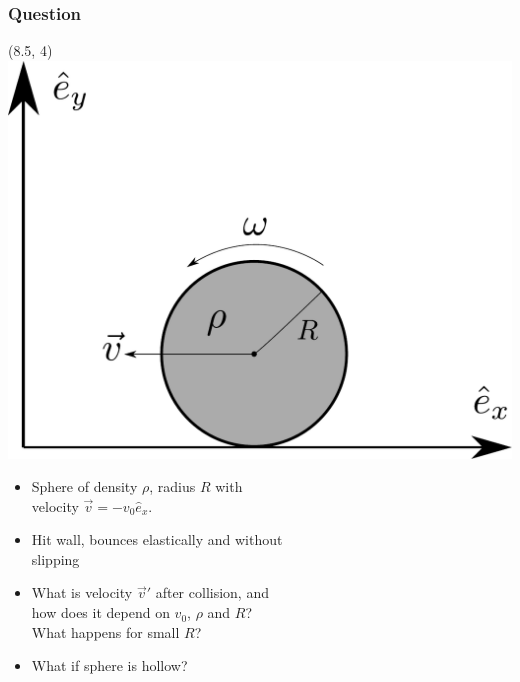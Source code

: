 \documentclass[aspectratio=169]{beamer}
\begin{document}
    \begin{frame}
        \frametitle{Question}
        \begin{textblock}{6}(8.5, 4)
            \includegraphics[width=\textwidth]{ball_setup.pdf}
        \end{textblock}
        \begin{itemize}
            \item Sphere of density $\rho$, radius $R$ with \\velocity $\vec v = - v_0 \hat e_x$.
            \item Hit wall, bounces elastically and without\\ slipping
            \item What is velocity $\vec v'$ after collision, and\\ how does it depend on $v_0$, $\rho$ and $R$?\\ What happens for small $R$?
            \item What if sphere is hollow?
        \end{itemize}
    \end{frame}
\end{document}
